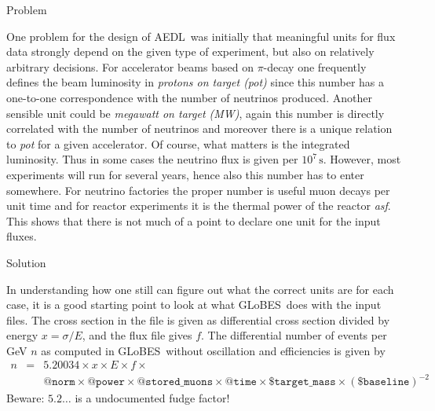 \documentclass[12pt]{article}
\makeatletter
\renewcommand{\section}{\@startsection{section}{1}{0em}{-\baselineskip}%
{\baselineskip}{\normalfont\large\bfseries}}
\newcommand{\GLOBES}{{\sf GLoBES}}
\newcommand{\AEDL}{{\sf AEDL}}
\makeatother
\begin{document}
\vspace*{.5cm}



\renewcommand{\thefootnote}{\arabic{footnote}}
\setcounter{footnote}{0}

\section{Problem}

One problem for the design of \AEDL\ was initially that meaningful
units for flux data strongly depend on the given type of experiment,
but also on relatively arbitrary decisions. For accelerator beams
based on $\pi$-decay one frequently defines the beam luminosity in
{\it protons on target (pot)} since this number has a one-to-one
correspondence with the number of neutrinos produced. Another sensible
unit could be {\it megawatt on target (MW)}, again this number is directly
correlated with the number of neutrinos and moreover there is a unique
relation to {\it pot} for a given accelerator. Of course,
what matters is the integrated luminosity. Thus in some  cases the
neutrino flux is given per $10^7\,\mathrm{s}$. However,
most experiments will run for several years, hence also this number
has to enter somewhere. For neutrino factories the proper number is
useful muon decays per unit time and for reactor experiments it is
the thermal power of the reactor {\it asf}. This shows that there is
not much of a  point to declare one unit for the input fluxes.

\section{Solution}

In understanding how one still can figure out what the correct units
are for each case, it is a good starting point to look at what
\GLOBES\ does with the input files. The cross section in the file is given as
differential cross section divided by energy $x=\sigma/E$, and the flux file
gives $f$. The differential number of events per GeV $n$ as computed in
\GLOBES\ without oscillation and efficiencies is given by
\begin{eqnarray}
n &=& 5.20034\times x\times E\times f\times\\
&&\mathtt{@norm}\times\mathtt{@power}\times\mathtt{@stored\_muons}\times\mathtt{@time}\times\mathtt{\$target\_mass}\times(\mathtt{\$baseline})^{-2}\nonumber
\end{eqnarray}
 Beware: $5.2\ldots$ is a undocumented fudge factor!
\end{document}
